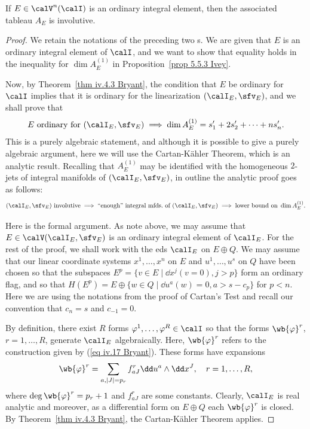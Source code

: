 \begin{thm}\label{thm iv.4.4 Bryant}
    If $E\in \calV^n(\calI)$ is an ordinary integral element, then the associated tableau $A_E$ is involutive.
\end{thm}
\begin{proof}
    We retain the notations of the preceding two \sect s. We are given that $E$ is an ordinary integral element of $\calI$, and we want to show that equality holds in the inequality for $\dim A_E^{(1)}$ in Proposition~\ref{prop 5.5.3 Ivey}.

    Now, by Theorem~\ref{thm iv.4.3 Bryant}, the condition that $E$ be ordinary for $\calI$ implies that it is ordinary for the linearization $(\calI_E,\sfv_E)$, and we shall prove that 
    \[E\text{ ordinary for }(\calI_E,\sfv_E)\implies \dim A^{(1)}_E=s_1'+2s_2'+\cdots+ns_n'.\]
    This is a purely algebraic statement, and although it is possible to give a purely algebraic argument, here we will use the Cartan-K\"ahler Theorem, which is an analytic result. Recalling that $A^{(1)}_E$ may be identified with the homogeneous $2$-jets of integral manifolds of $(\calI_E,\sfv_E)$, in outline the analytic proof goes as follows:
    \[(\calI_E,\sfv_E)\text{ involutive}\implies \text{``enough'' integral mfds.\ of }(\calI_E,\sfv_E)\implies \text{lower bound on }\dim A^{(1)}_E.\]

    Here is the formal argument. As note above, we may assume that $E\in \calV(\calI_E,\sfv_E)$ is an ordinary integral element of $\calI_E$. For the rest of the proof, we shall work with the \gls{eds} $\calI_E$ on $E\oplus Q$. We may assume that our linear coordinate systems $x^1,\ldots,x^n$ on $E$ and $u^1,\ldots,u^s$ on $Q$ have been chosen so that the subspaces $E^p=\{v\in E\mid \dd x^j(v=0),j>p\}$ form an ordinary flag, and so that $H(E^p)=E\oplus \{w\in Q\mid \dd u^a(w)=0,a>s-c_p\}$ for $p<n$. Here we are using the notations from the proof of Cartan's Test and recall our convention that $c_n=s$ and $c_{-1}=0$.

    By definition, there exist $R$ forms $\varphi^1,\ldots,\varphi^R\in\calI$ so that the forms $\wb{\varphi}^r$, $r=1,\ldots,R$, generate $\calI_E$ algebraically. Here, $\wb{\varphi}^r$ refers to the construction given by (\ref{eq iv.17 Bryant}). These forms have expansions 
    \[\wb{\varphi}^r=\sum_{a,|J|=p_r}f^r_{aJ}\dd u^a\wedge\dd x^J,\quad r=1,\ldots,R,\]
    where $\deg\wb{\varphi}^r=p_r+1$ and $f^r_{aJ}$ are some constants. Clearly, $\calI_E$ is real analytic and moreover, as a differential form on $E\oplus Q$ each $\wb{\varphi}^r$ is closed. By Theorem~\ref{thm iv.4.3 Bryant}, the Cartan-K\"ahler Theorem applies.


\end{proof}

